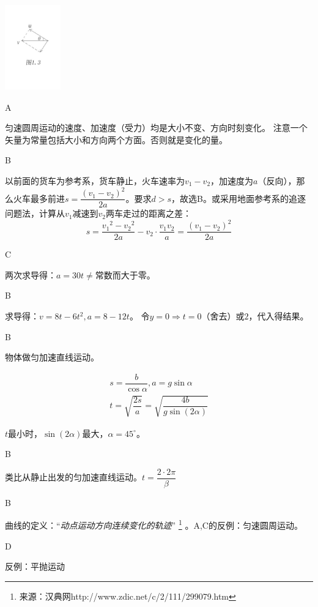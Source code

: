 \documentclass[b5paper,opensource]{./template/qyxf-book}
\begin{document}
\centerline{\includegraphics[width=6.5em,height=10em]{Chp1_illus3.png}}

A

\solve 匀速圆周运动的速度、加速度（受力）均是大小不变、方向时刻变化。
注意一个矢量为常量包括大小和方向两个方面。否则就是变化的量。

B

\solve 以前面的货车为参考系，货车静止，火车速率为$v_1-v_2$，加速度为$a$（反向），那么火车最多前进$s=\dfrac{{(v_1-v_2)}^2}{2a}$。要求$d>s$，故选B。或采用地面参考系的追逐问题法，计算从$v_1$减速到$v_2$两车走过的距离之差：
\[
s=\dfrac{{v_1}^2-{v_2}^2}{2a}-v_2\cdot \dfrac{v_1v_2}{a}=\dfrac{{(v_1-v_2)}^2}{2a}
\]

C

\solve 两次求导得：$a=30t\neq$常数而大于零。

B

\solve 求导得：$v=8t-6t^2,a=8-12t$。
令$y=0\Rightarrow t=0\text{（舍去）或}2$，代入得结果。

B

\solve 物体做匀加速直线运动。

\begin{gather*}
s=\dfrac{b}{\cos\alpha},a=g\sin\alpha\\
t=\sqrt{\dfrac{2s}{a}}=\sqrt{\dfrac{4b}{g\sin(2\alpha)}}
\end{gather*}

$t$最小时，$\sin(2\alpha)$最大，$\alpha=45^\circ$。

B

\solve 类比从静止出发的匀加速直线运动。$t=\dfrac{2\cdot 2\pi}{\beta}$

B

\solve 曲线的定义：“\textit{动点运动方向连续变化的轨迹}”
\footnote{来源：汉典网http://www.zdic.net/c/2/111/299079.htm}
。A,C的反例：匀速圆周运动。

D

\solve 反例：平抛运动
\end{document}
